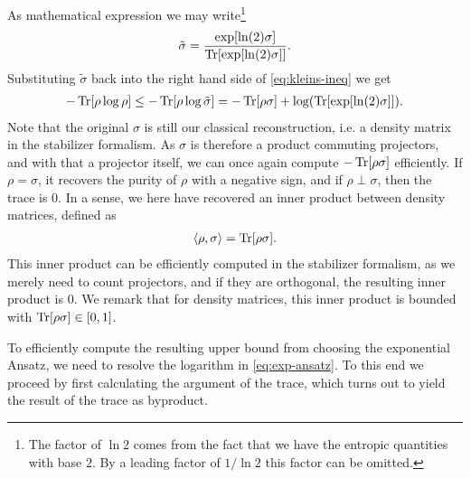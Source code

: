 As mathematical expression we may write\footnote{The factor of $\ln 2$ comes
  from the fact that we have the entropic quantities with base $2$. By a
leading factor of $1 /\ln 2$ this factor can be omitted.}
\begin{align}
  \tilde{\sigma} = \frac{\exp[\ln(2) \sigma]}{\Tr[\exp[\ln(2) \sigma]]}
.\end{align}
Substituting $\tilde{\sigma}$ back into the right hand side of
\cref{eq:kleins-ineq} we get
\begin{align}\label{eq:exp-ansatz}
  -\Tr[\rho\log\rho]\leq-\Tr[\rho\log\tilde{\sigma}] = -\Tr[\rho\sigma] +
  \log(\Tr[\exp[\ln(2)\sigma]])
.\end{align}
Note that the original $\sigma$ is still our classical reconstruction, i.e. a
density matrix in the stabilizer formalism. As $\sigma$ is therefore a product
commuting projectors, and with that a projector itself, we can once again
compute $-\Tr[\rho\sigma]$ efficiently. If $\rho=\sigma$, it recovers the
purity of $\rho$ with a negative sign, and if $\rho \perp \sigma$, then the trace is $0$. In a
sense, we here have recovered an inner product between density matrices, defined
as
\begin{align}
  \langle \rho, \sigma \rangle = \Tr[\rho\sigma]
.\end{align}
This inner product can be efficiently computed in the stabilizer formalism, as
we merely need to count projectors, and if they are orthogonal, the resulting
inner product is $0$. We remark that for density matrices, this inner product
is bounded with $\Tr[\rho\sigma] \in [0,1]$.

To efficiently compute the resulting upper bound from choosing the exponential
Ansatz, we need to resolve the logarithm in \cref{eq:exp-ansatz}. To this end
we proceed by first calculating the argument of the trace, which turns out to
yield the result of the trace as byproduct.

